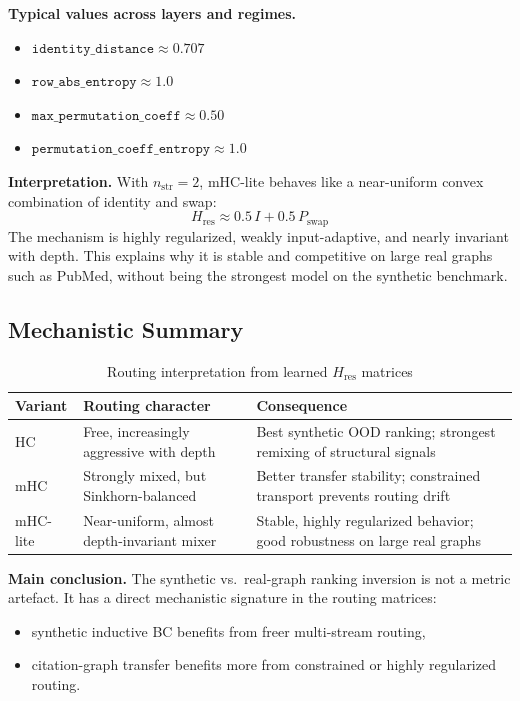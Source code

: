 \documentclass[11pt,a4paper]{article}
\begin{document}
\textbf{Typical values across layers and regimes.}
\begin{itemize}[noitemsep]
  \item $\texttt{identity\_distance} \approx 0.707$
  \item $\texttt{row\_abs\_entropy} \approx 1.0$
  \item $\texttt{max\_permutation\_coeff} \approx 0.50$
  \item $\texttt{permutation\_coeff\_entropy} \approx 1.0$
\end{itemize}

\textbf{Interpretation.}
With $n_{\mathrm{str}}=2$, mHC-lite behaves like a near-uniform convex combination
of identity and swap:
\[
H_{\mathrm{res}} \approx 0.5\,I + 0.5\,P_{\mathrm{swap}}
\]
The mechanism is highly regularized, weakly input-adaptive,
and nearly invariant with depth.
This explains why it is stable and competitive on large real graphs such as PubMed,
without being the strongest model on the synthetic benchmark.

\subsection{Mechanistic Summary}

\begin{table}[h]
\centering
\caption{Routing interpretation from learned $H_{\mathrm{res}}$ matrices}
\begin{tabular}{L{2.6cm} L{4.1cm} L{4.7cm}}
\toprule
Variant & Routing character & Consequence \\
\midrule
HC & Free, increasingly aggressive with depth &
Best synthetic OOD ranking; strongest remixing of structural signals \\
mHC & Strongly mixed, but Sinkhorn-balanced &
Better transfer stability; constrained transport prevents routing drift \\
mHC-lite & Near-uniform, almost depth-invariant mixer &
Stable, highly regularized behavior; good robustness on large real graphs \\
\bottomrule
\end{tabular}
\end{table}

\textbf{Main conclusion.}
The synthetic vs.\ real-graph ranking inversion is not a metric artefact.
It has a direct mechanistic signature in the routing matrices:
\begin{itemize}[noitemsep]
  \item synthetic inductive BC benefits from freer multi-stream routing,
  \item citation-graph transfer benefits more from constrained or highly regularized routing.
\end{itemize}
\end{document}
